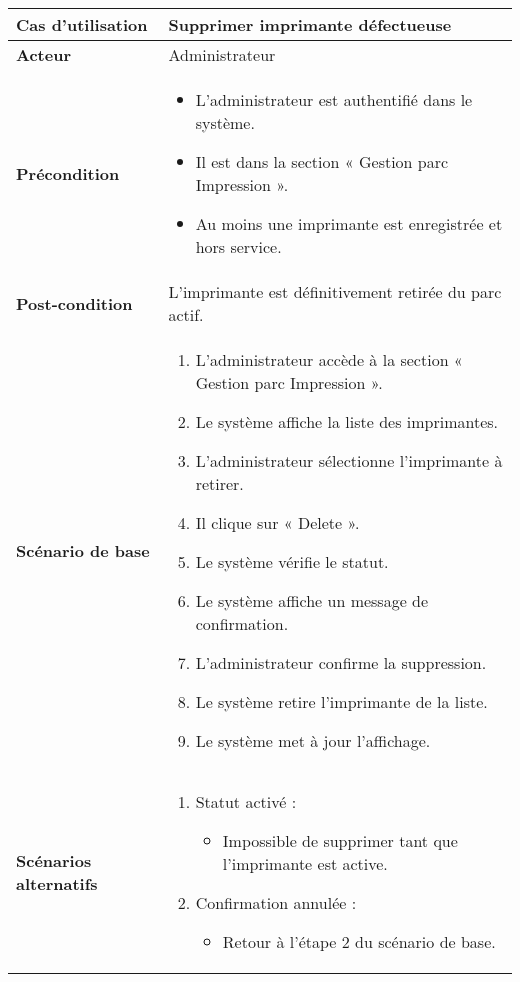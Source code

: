 \documentclass[a4paper,11pt]{report}
\begin{document}
\begin{tabularx}{\textwidth}{|>{\bfseries}l|X|}
\hline
Cas d’utilisation    & Supprimer imprimante défectueuse \\
\hline
Acteur               & Administrateur \\
\hline
Précondition         &
\begin{itemize}[left=0pt]
  \item L’administrateur est authentifié dans le système.
  \item Il est dans la section « Gestion parc Impression ».
  \item Au moins une imprimante est enregistrée et hors service.
\end{itemize} \\
\hline
Post-condition       & L’imprimante est définitivement retirée du parc actif. \\
\hline
Scénario de base     &
\begin{enumerate}[left=0pt]
  \item L’administrateur accède à la section « Gestion parc Impression ».
  \item Le système affiche la liste des imprimantes.
  \item L’administrateur sélectionne l’imprimante à retirer.
  \item Il clique sur « Delete ».
  \item Le système vérifie le statut.
  \item Le système affiche un message de confirmation.
  \item L’administrateur confirme la suppression.
  \item Le système retire l’imprimante de la liste.
  \item Le système met à jour l’affichage.
\end{enumerate} \\
\hline
Scénarios alternatifs &
\begin{enumerate}[label=\arabic*.a,wide=0pt]
  \item Statut activé :
    \begin{itemize}[left=1em]
      \item Impossible de supprimer tant que l’imprimante est active.
    \end{itemize}
  \item Confirmation annulée :
    \begin{itemize}[left=1em]
      \item Retour à l’étape 2 du scénario de base.
    \end{itemize}
\end{enumerate} \\
\hline
\end{tabularx}
\end{document}
